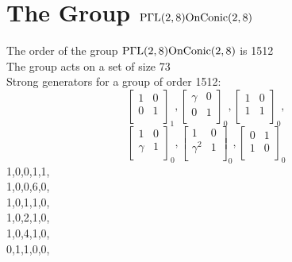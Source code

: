 \section*{The Group ${\rm P}\Gamma {\rm L}(2,8){\rm OnConic}(2,8)$}
\noindent The order of the group ${\rm P}\Gamma {\rm L}(2,8){\rm OnConic}(2,8)$ is 1512\\
\noindent The group acts on a set of size 73\\
Strong generators for a group of order 1512:
$$
\left[
\begin{array}{*{2}{r}}
1 & 0\\
0 & 1\\
\end{array}
\right]
_{1}
, 
\left[
\begin{array}{*{2}{r}}
\gamma  & 0\\
0 & 1\\
\end{array}
\right]
_{0}
, 
\left[
\begin{array}{*{2}{r}}
1 & 0\\
1 & 1\\
\end{array}
\right]
_{0}
, 
$$
$$
\left[
\begin{array}{*{2}{r}}
1 & 0\\
\gamma  & 1\\
\end{array}
\right]
_{0}
, 
\left[
\begin{array}{*{2}{r}}
1 & 0\\
\gamma^{2} & 1\\
\end{array}
\right]
_{0}
, 
\left[
\begin{array}{*{2}{r}}
0 & 1\\
1 & 0\\
\end{array}
\right]
_{0}
$$
1,0,0,1,1,\\
1,0,0,6,0,\\
1,0,1,1,0,\\
1,0,2,1,0,\\
1,0,4,1,0,\\
0,1,1,0,0,\\
